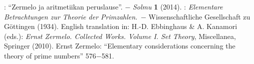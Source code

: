 \documentclass[12pt]{article}
\begin{document}
\begin{thebibliography}{8}
: ``Zermelo ja aritmetiikan 
peruslause''. $-$ {\it Solmu} \textbf{1} (2014).
: {\it Elementare
Betrachtungen zur Theorie der Primzahlen}.\, $-$ Wissenschaftliche Gesellschaft zu 
G\"ottingen (1934). English translation in:
 H.-D. Ebbinghaus \& A. Kanamori (eds.): {\it Ernst Zermelo. Collected
Works. Volume I. Set Theory}, Miscellanea, Springer (2010).  Ernst Zermelo: ``Elementary 
considerations concerning the theory of prime numbers'' 576$-$581. 

\end{thebibliography} 
\end{document}
